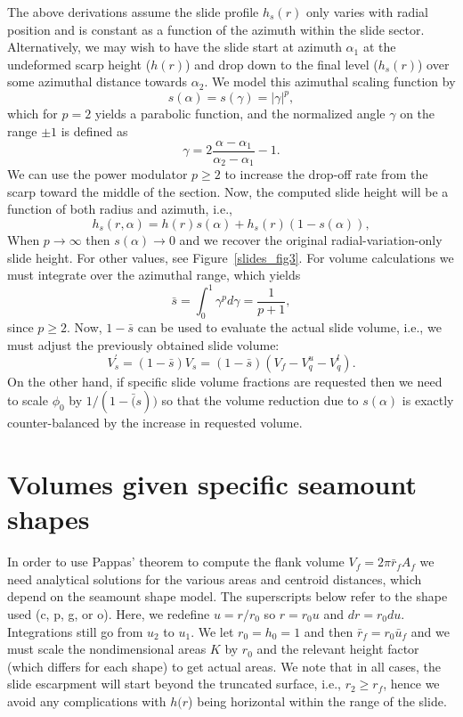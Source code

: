 \documentclass[12pt,letterpaper,margin=0.5in]{report}
\begin{document}
The above derivations assume the slide profile $h_s(r)$ only varies with radial position and is constant as a function of the azimuth within the slide sector.
Alternatively, we may wish to have the slide start at azimuth $\alpha_1$ at the undeformed scarp height ($h(r)$) and drop down to the final level ($h_s(r)$)
over some azimuthal distance towards $\alpha_2$.  We model this azimuthal scaling function by
\begin{equation}
s(\alpha) = s(\gamma) = \left |\gamma\right|^p,
\end{equation}
which for $p = 2$ yields a parabolic function, and the normalized angle $\gamma$ on the range $\pm1$ is defined as
\begin{equation}
\gamma = 2\frac{\alpha - \alpha_1}{\alpha_2 - \alpha_1} - 1.
\end{equation}
We can use the power modulator $p \ge 2$ to increase the drop-off rate from the scarp toward the middle of the section. Now, the computed slide height will be a function
of both radius and azimuth, i.e.,
\begin{equation}
h_s(r, \alpha) = h(r) s(\alpha) + h_s(r) (1 - s(\alpha)),
\end{equation}
When $p \rightarrow \infty$ then $s(\alpha) \rightarrow 0$ and we recover the original radial-variation-only slide height. For other values,
see Figure~\ref{slides_fig3}.
For volume calculations we must integrate over the azimuthal range, which yields
\begin{equation}
\bar{s} = \int_0^1  \gamma^p d\gamma = \frac{1}{p+1},
\end{equation}
since $p \ge 2$. Now, $1 - \bar{s}$ can be used to evaluate the actual slide volume, i.e., we must adjust the previously obtained slide volume:
\begin{equation}
V_s^' = (1 - \bar{s}) V_s = (1 - \bar{s}) \left (V_f - V^u_q - V^l_q \right).
\end{equation}
On the other hand, if specific slide volume fractions are requested then we need to scale $\phi_0$ by $1/(1 - \bar(s))$ so that the
volume reduction due to $s(\alpha)$ is exactly counter-balanced by the increase in requested volume.

\section{Volumes given specific seamount shapes}

In order to use Pappas' theorem to compute the flank volume $V_f = 2 \pi \bar{r}_f A_f$ we need analytical
solutions for the various areas and centroid distances, which depend on the seamount shape model.  The
superscripts below refer to the shape used (c, p, g, or o). Here,
we redefine $u = r/r_0$ so $r = r_0 u$ and $dr = r_0 du$.  Integrations still go from $u_2$
to $u_1$.  We let $r_0 = h_0 = 1$ and then $\bar{r}_f = r_0 \bar{u}_f$ and we must scale the nondimensional areas $K$
by $r_0$ and the relevant height factor (which differs for each shape) to get actual areas. We note that
in all cases, the slide escarpment will start beyond the truncated surface, i.e., $r_2 \ge r_f$, hence we avoid
any complications with $h(r$) being horizontal within the range of the slide.
\end{document}
